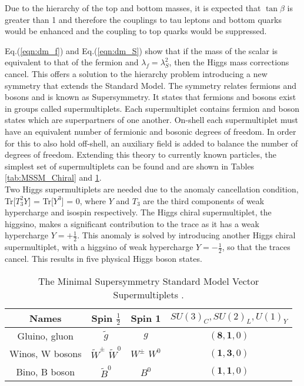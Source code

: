 Due to the hierarchy of the top and bottom masses, it is expected that $\tan\beta$ is greater than 1 and therefore the couplings to tau leptons and bottom quarks would be enhanced and the coupling to top quarks would be suppressed.

Eq.(\ref{eqn:dm_f}) and Eq.(\ref{eqn:dm_S}) show that if the mass of the scalar is equivalent to that of the fermion and \(\lambda_f = \lambda_{S}^{2}\), then the Higgs mass corrections cancel. This offers a solution to the hierarchy problem introducing a new symmetry that extends the Standard Model. The symmetry relates fermions and bosons and is known as Supersymmetry. It states that fermions and bosons exist in groups called supermultiplets. Each supermultiplet contains fermion and boson states which are superpartners of one another. On-shell each supermultiplet must have an equivalent number of fermionic and bosonic degrees of freedom. In order for this to also hold off-shell, an auxiliary field is added to balance the number of degrees of freedom. Extending this theory to currently known particles, the simplest set of supermultiplets can be found and are shown in Tables \ref{tab:MSSM_Chiral} and \ref{tab:MSSM_vector}. \\

Two Higgs supermultiplets are needed due to the anomaly cancellation condition, Tr[\(T_{3}^{2}Y\)] = Tr[\(Y^3\)] = 0, where \(Y\) and \(T_3\) are the third components of weak hypercharge and isospin respectively. The Higgs chiral supermultiplet, the higgsino, makes a significant contribution to the trace as it has a weak hypercharge \(Y=+\frac{1}{2}\). This anomaly is solved by introducing another Higgs chiral supermultiplet, with a higgsino of weak hypercharge \(Y=-\frac{1}{2}\), so that the traces cancel. This results in five physical Higgs boson states. 

\begin{table}[H]
\centering
\begin{tabular}{c||ccc}
     \hline
     Names & Spin \(\frac{1}{2}\) & Spin 1 & \(SU(3)_C, SU(2)_L, U(1)_Y \)\\
     \hline
     \hline
     Gluino, gluon & \(\tilde{g}\) & \(g\) & \((\textbf{8},\textbf{1},0)\) \\
     Winos, W bosons & \(\tilde{W}^{\pm}\) \(\tilde{W}^{0}\) & \(W^{\pm}\) \(W^0\) & \((\textbf{1},\textbf{3},0)\) \\
     Bino, B boson & \(\tilde{B}^{0}\) & \(B^0\) & \((\textbf{1},\textbf{1},0)\) \\
     \hline
\end{tabular}
\caption{The Minimal Supersymmetry Standard Model Vector Supermultiplets \cite{SUSY_Primer}.}
\label{tab:MSSM_vector}
\end{table}


